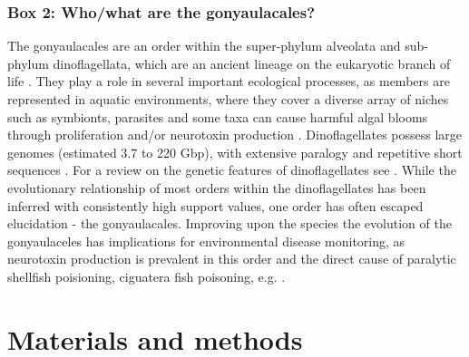 \documentclass[12pt]{article}
\begin{document}
\subsubsection*{Box 2: Who/what are the gonyaulacales?}
The gonyaulacales are an order within the super-phylum alveolata and sub-phylum dinoflagellata, which are an ancient lineage on the eukaryotic branch of life \cite{moldowan1998biogeochemical}. 
They play a role in several important ecological processes, as members are represented in aquatic environments, where they cover a diverse array of niches such as symbionts, parasites and some taxa can cause harmful algal blooms through proliferation and/or neurotoxin production \cite{murray2016unravelling}.
Dinoflagellates possess large genomes (estimated 3.7 to 220 Gbp), with extensive paralogy and repetitive short sequences  \cite{casabianca2017genome,murray2016unravelling}. 
For a review on the genetic features of dinoflagellates see \cite{murray2016unravelling}. 
While the evolutionary relationship of most orders within the dinoflagellates has been inferred with consistently high support values, one order has often escaped elucidation - the gonyaulacales. 
Improving upon the species the evolution of the gonyaulaceles has implications for environmental disease monitoring, as neurotoxin production is prevalent in this order and the direct cause of paralytic shellfish poisioning, ciguatera fish poisoning, e.g. \cite{shalchian2006combined,zhang2007three,saldarriaga2004molecular,hoppenrath2010dinoflagellate,murray2005improving}. 

\newpage
\section{Materials and methods}
\end{document}
